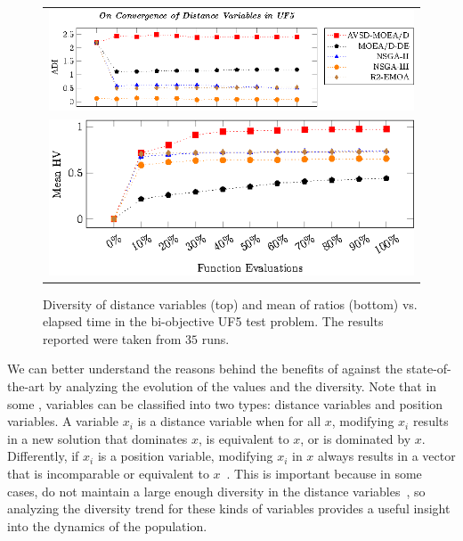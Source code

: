 \begin{figure}[t]
\centering
\begin{tabular}{l}
 \includegraphics[scale=0.75]{images/Diversity_Long_Term_tikz_UF5-figure0.eps}\\[0cm]%
 \includegraphics[scale=0.75]{images/Diversity_Long_Term_tikz_UF5-figure1.eps}\\[0cm]%
\end{tabular}
\caption{Diversity of distance variables (top) and mean of \HV{} ratios (bottom) vs. elapsed time in the bi-objective UF5 test problem. The results reported were taken from $35$ runs.}\label{fig:UF5_Diversity}
\end{figure}

We can better understand the reasons behind the benefits of \AVSDMOEAD{} against the state-of-the-art \MOEAS{}
by analyzing the evolution of the \HV{} values and the diversity.
%
Note that in some \MOPS{}, variables can be classified into two types: 
distance variables and position variables.
%
A variable $x_i$ is a distance variable when for all $x$, modifying $x_i$ results in a new solution 
that dominates $x$, is equivalent to $x$, or is dominated by $x$.
%
Differently, if $x_i$ is a position variable, modifying $x_i$ in $x$ always results in a vector that is 
incomparable or equivalent to $x$~\cite{huband2006review}.
%
This is important because in some cases, \MOEAS{} do not maintain a large enough diversity in the distance
variables~\cite{castillo2017multi}, so analyzing the diversity trend for these kinds of variables provides a useful
insight into the dynamics of the population.

